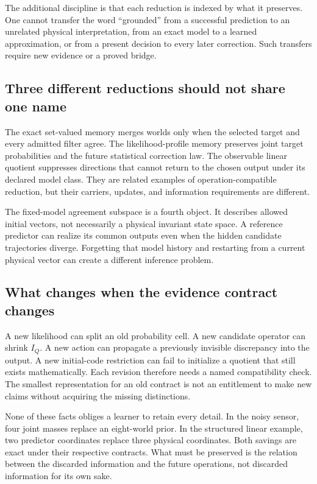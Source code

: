 The additional discipline is that each reduction is indexed by what it preserves. One cannot transfer the word ``grounded'' from a successful prediction to an unrelated physical interpretation, from an exact model to a learned approximation, or from a present decision to every later correction. Such transfers require new evidence or a proved bridge.

\subsection{Three different reductions should not share one name}
The exact set-valued memory merges worlds only when the selected target and every admitted filter agree. The likelihood-profile memory preserves joint target probabilities and the future statistical correction law. The observable linear quotient suppresses directions that cannot return to the chosen output under its declared model class. They are related examples of operation-compatible reduction, but their carriers, updates, and information requirements are different.

The fixed-model agreement subspace is a fourth object. It describes allowed initial vectors, not necessarily a physical invariant state space. A reference predictor can realize its common outputs even when the hidden candidate trajectories diverge. Forgetting that model history and restarting from a current physical vector can create a different inference problem.

\subsection{What changes when the evidence contract changes}
A new likelihood can split an old probability cell. A new candidate operator can shrink $I_Q$. A new action can propagate a previously invisible discrepancy into the output. A new initial-code restriction can fail to initialize a quotient that still exists mathematically. Each revision therefore needs a named compatibility check. The smallest representation for an old contract is not an entitlement to make new claims without acquiring the missing distinctions.

None of these facts obliges a learner to retain every detail. In the noisy sensor, four joint masses replace an eight-world prior. In the structured linear example, two predictor coordinates replace three physical coordinates. Both savings are exact under their respective contracts. What must be preserved is the relation between the discarded information and the future operations, not discarded information for its own sake.

